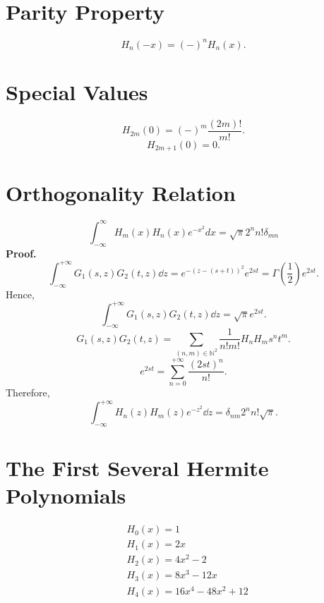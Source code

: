 \documentclass{article}
\theoremstyle{1}
\theoremstyle{2}
\begin{document}
\section{Parity Property}
\begin{equation}
    H_n(-x)=(-)^nH_n(x).
\end{equation}
\section{Special Values}
\begin{equation}
    H_{2m}(0)=(-)^m\frac{(2m)!}{m!}.
\end{equation}
\begin{equation}
    H_{2m+1}(0)=0.
\end{equation}
\section{Orthogonality Relation}
\begin{equation}
    \int_{-\infty}^{\infty} H_m(x) H_n(x) e^{-x^2} dx = \sqrt{\pi} 2^n n! \delta_{mn}
\end{equation}
\textbf{Proof.}
\begin{equation}
        \int_{-\infty}^{+\infty}G_1(s,z)G_2(t,z)\dd{z}=e^{-(z-(s+t))^2}e^{2st}=\Gamma(\frac{1}{2})e^{2st}.
    \end{equation}
    Hence,
    \begin{equation}
        \int_{-\infty}^{+\infty}G_1(s,z)G_2(t,z)\dd{z}=\sqrt{\pi}e^{2st}.
    \end{equation}
    \begin{equation}
        G_1(s,z)G_2(t,z)=\sum_{(n,m)\in \mathbb{N}^2}\frac{1}{n!m!}H_nH_ms^nt^m.
    \end{equation}
    \begin{equation}
        e^{2st}=\sum_{n=0}^{+\infty}\frac{(2st)^n}{n!}.
    \end{equation}
    Therefore,
    \begin{equation}
        \boxed{\int_{-\infty}^{+\infty}H_n(z)H_m(z)e^{-z^2}\dd{z}=\delta_{nm}2^nn!\sqrt{\pi}.}
    \end{equation}
\section{The First Several Hermite Polynomials}
\begin{eqnarray*}
    &H_0(x)=1\\
    &H_1(x)=2x\\
    &H_2(x)=4x^2-2\\
    &H_3(x)=8x^3-12x\\
    &H_4(x)=16x^4-48x^2+12\\
\end{eqnarray*}
\end{document}
